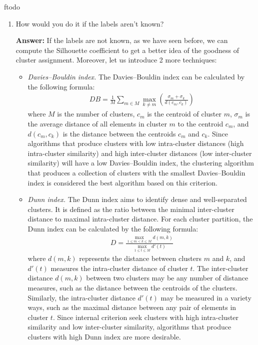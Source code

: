 ƒtodo\documentclass{article}
\newenvironment{QandA}{\begin{enumerate}[label=\arabic*.]}{\end{enumerate}}
\newenvironment{InnerQandA}{\begin{enumerate}[label=\roman*.]}{\end{enumerate}}
\newenvironment{answer}{\par\normalfont \textbf{Answer:}}{}
\begin{document}
\begin{QandA}
\begin{InnerQandA}
        \item How would you do it if the labels aren’t known?
        \begin{answer}
            If the labels are not known, as we have seen before, we can compute the Silhouette coefficient to get a better idea of the goodness of cluster assignment. Moreover, let us introduce 2 more techniques:
            \begin{itemize}
                \item \textit{Davies–Bouldin index.} The Davies–Bouldin index can be calculated by the following formula:
                \begin{align*}
                    DB = \frac{1}{M}\sum_{m \in M} \max_{k \neq m} \left( \frac{\sigma_m + \sigma_k}{d(c_m, c_k)} \right)
                \end{align*}
                where $M$ is the number of clusters, $c_m$ is the centroid of cluster $m$, $\sigma_m$ is the average distance of all elements in cluster $m$ to the centroid $c_m$, and $d(c_m, c_k)$ is the distance between the centroids $c_m$ and $c_k$. Since algorithms that produce clusters with low intra-cluster distances (high intra-cluster similarity) and high inter-cluster distances (low inter-cluster similarity) will have a low Davies–Bouldin index, the clustering algorithm that produces a collection of clusters with the smallest Davies–Bouldin index is considered the best algorithm based on this criterion. 

                \item \textit{Dunn index.} The Dunn index aims to identify dense and well-separated clusters. It is defined as the ratio between the minimal inter-cluster distance to maximal intra-cluster distance. For each cluster partition, the Dunn index can be calculated by the following formula:
                \begin{align*}
                    D = \frac{\max_{1 \le m < k \le M}d(m, k)}{\max_{1 \le t \le M} d'(t)}
                \end{align*}
                where $d(m, k)$ represents the distance between clusters $m$ and $k$, and $d'(t)$ measures the intra-cluster distance of cluster $t$. The inter-cluster distance $d(m,k)$ between two clusters may be any number of distance measures, such as the distance between the centroids of the clusters. Similarly, the intra-cluster distance $d'(t)$ may be measured in a variety ways, such as the maximal distance between any pair of elements in cluster $t$. Since internal criterion seek clusters with high intra-cluster similarity and low inter-cluster similarity, algorithms that produce clusters with high Dunn index are more desirable.
            \end{itemize}
        \end{answer}


\end{InnerQandA}
\end{QandA}
\end{document}

